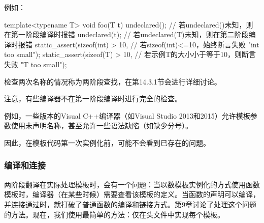 例如：

\begin{cpp}
template<typename T>
void foo(T t)
{
	undeclared(); // 若undeclared()未知，则在第一阶段编译时报错
	undeclared(t); // 若undeclared(T)未知，则在第二阶段编译时报错
	static_assert(sizeof(int) > 10, // 若sizeof(int)<=10，始终断言失败
				  "int too small");
	static_assert(sizeof(T) > 10, // 若示例T的大小小于等于10，则断言失败
	              "T too small");
}
\end{cpp}

检查两次名称的情况称为两阶段查找，在第14.3.1节会进行详细讨论。

注意，有些编译器不在第一阶段编译时进行完全的检查。

\begin{notice}
例如，一些版本的Visual C++编译器（如Visual Studio 2013和2015）允许模板参数使用未声明名称，甚至允许一些语法缺陷（如缺少分号）。
\end{notice}

因此，在模板代码第一次实例化前，可能不会看到已存在的问题。

\subsubsection{编译和连接}

两阶段翻译在实际处理模板时，会有一个问题：当以数模板实例化的方式使用函数模板时，编译器（在某些时候）需要查看该模板的定义。当函数的声明可以编译，并连接通过时，就打破了普通函数的编译和链接方式。第9章讨论了处理这个问题的方法。现在，我们使用最简单的方法：仅在头文件中实现每个模板。








